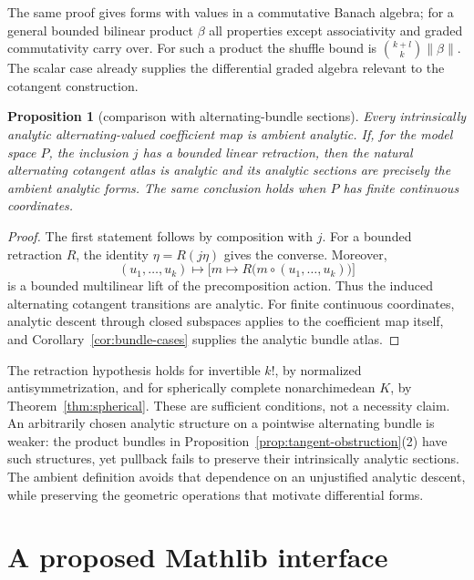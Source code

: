 \documentclass[11pt]{amsart}
\newtheorem{proposition}[theorem]{Proposition}
\theoremstyle{definition}
\theoremstyle{remark}
\numberwithin{equation}{section}
\newcommand{\norm}[1]{\lVert #1\rVert}
\begin{document}
The same proof gives forms with values in a commutative Banach algebra; for a general bounded bilinear product $\beta$ all properties except associativity and graded commutativity carry over. For such a product the shuffle bound is $\binom{k+l}{k}\norm{\beta}$. The scalar case already supplies the differential graded algebra relevant to the cotangent construction.

\begin{proposition}[comparison with alternating-bundle sections]\label{prop:ambient-agreement}
Every intrinsically analytic alternating-valued coefficient map is ambient analytic. If, for the model space $P$, the inclusion $j$ has a bounded linear retraction, then the natural alternating cotangent atlas is analytic and its analytic sections are precisely the ambient analytic forms. The same conclusion holds when $P$ has finite continuous coordinates.
\end{proposition}

\begin{proof}
The first statement follows by composition with $j$. For a bounded retraction $R$, the identity $\eta=R(j\eta)$ gives the converse. Moreover,
\[
 (u_1,\ldots,u_k)\longmapsto
 \bigl[m\longmapsto R\bigl(m\circ(u_1,\ldots,u_k)\bigr)\bigr]
\]
is a bounded multilinear lift of the precomposition action. Thus the induced alternating cotangent transitions are analytic. For finite continuous coordinates, analytic descent through closed subspaces applies to the coefficient map itself, and Corollary~\ref{cor:bundle-cases} supplies the analytic bundle atlas.
\end{proof}

The retraction hypothesis holds for invertible $k!$, by normalized antisymmetrization, and for spherically complete nonarchimedean $K$, by Theorem~\ref{thm:spherical}. These are sufficient conditions, not a necessity claim. An arbitrarily chosen analytic structure on a pointwise alternating bundle is weaker: the product bundles in Proposition~\ref{prop:tangent-obstruction}(2) have such structures, yet pullback fails to preserve their intrinsically analytic sections. The ambient definition avoids that dependence on an unjustified analytic descent, while preserving the geometric operations that motivate differential forms.

\section{A proposed Mathlib interface}\label{sec:mathlib-interface}
\end{document}
